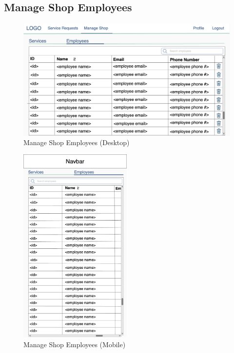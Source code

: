 \documentclass[12pt, titlepage]{article}
\begin{document}
\subsection{Manage Shop Employees}

\begin{figure}[H]
	\centering
	\includegraphics[width=\textwidth]{mockups/Manage Shop (Employees) (Desktop).png}
	\caption{Manage Shop \textemdash{} Employees (Desktop)}
\end{figure}

\begin{figure}[H]
	\centering
	\includegraphics[width=0.5\textwidth]{mockups/Manage Shop (Employees) (Mobile).png}
	\caption{Manage Shop \textemdash{} Employees (Mobile)}
\end{figure}
\end{document}
